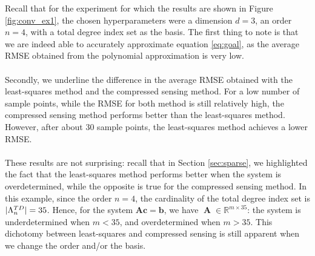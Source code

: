 \documentclass[12pt, oneside]{report}   	%
\newcommand{\R}{\mathbb{R}}
\DeclarePairedDelimiter{\abs}{\lvert}{\rvert}
\DeclareMathOperator{\Adj}{\boldsymbol{A}}
\begin{document}
Recall that for the experiment for which the results are shown in Figure \ref{fig:conv_ex1}, the chosen hyperparameters were a dimension $d=3$, an order $n=4$, with a total degree index set as the basis. The first thing to note is that we are indeed able to accurately approximate equation \eqref{eq:goal}, as the average RMSE obtained from the polynomial approximation is very low.\\\\
Secondly, we underline the difference in the average RMSE obtained with the least-squares method and the compressed sensing method. For a low number of sample points, while the RMSE for both method is still relatively high, the compressed sensing method performs better than the least-squares method. However, after about 30 sample points, the least-squares method achieves a lower RMSE.\\\\ 
These results are not surprising: recall that in Section \ref{sec:sparse}, we highlighted the fact that the least-squares method performs better when the system is overdetermined, while the opposite is true for the compressed sensing method. In this example, since the order $n=4$, the cardinality of the total degree index set is $\abs{\Lambda_n^{TD}}=35$. Hence, for the system $\boldsymbol{Ac}=\boldsymbol{b}$, we have $\Adj\in\R^{m\times35}$: the system is underdetermined when $m<35$, and overdetermined when $m>35$. This dichotomy between least-squares and compressed sensing is still apparent when we change the order and/or the basis. \\\\
\end{document}
